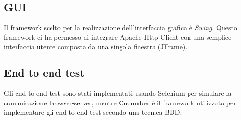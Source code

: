 \subsection{GUI}
Il framework scelto per la realizzazione dell'interfaccia grafica \`e \emph{Swing}. Questo framework ci ha permesso di integrare Apache Http Client con una semplice interfaccia utente composta da una singola finestra (JFrame).
\subsection{End to end test}
Gli end to end test sono stati implementati usando Selenium per simulare la comunicazione browser-server; mentre Cucumber \`e il framework utilizzato per implementare gli end to end test secondo una tecnica BDD.